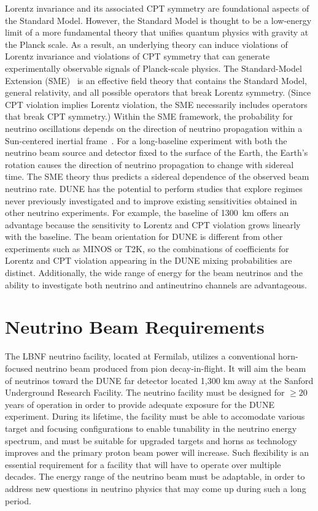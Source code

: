 Lorentz invariance and its associated CPT symmetry
are foundational aspects of the Standard Model. However, the Standard Model is thought to be a low-energy limit of a more fundamental theory that unifies quantum physics with gravity at the Planck
scale. As a result, an underlying theory can induce violations of Lorentz invariance and
violations of CPT symmetry that can generate experimentally observable signals of Planck-scale physics.
The Standard-Model Extension (SME)~\cite{Colladay:1996iz,Colladay:1998fq,Kostelecky:2003fs} is an effective field theory that contains the Standard Model, general relativity, and all possible operators that break Lorentz symmetry. (Since CPT violation implies Lorentz violation, the SME necessarily includes operators that break CPT symmetry.)  Within the SME framework, the probability for neutrino oscillations depends on the direction of neutrino propagation within a Sun-centered inertial frame~\cite{Kostelecky:2003cr,Kostelecky:2011gq}.  For a long-baseline experiment with both the neutrino beam source and detector fixed to the surface of the Earth, the Earth's rotation causes the direction of neutrino propagation to change with sidereal time.  The SME theory thus predicts a sidereal dependence of the observed beam neutrino rate.  DUNE has the potential to perform studies that explore regimes never previously investigated and to improve existing
sensitivities obtained in other neutrino experiments.
For example, the baseline of 1300~km offers an advantage because the sensitivity to 
Lorentz and CPT violation grows linearly with the baseline.   The
beam orientation for DUNE is different from other experiments such as MINOS or T2K, so
the combinations of coefficients for Lorentz and CPT violation appearing in the DUNE mixing probabilities are
distinct. Additionally, the wide range of energy for the beam neutrinos and the ability to investigate both neutrino and antineutrino channels are advantageous.

\section{Neutrino Beam Requirements}
\label{sec:physics-lbnosc-beam-req}
The LBNF neutrino facility, located at Fermilab, utilizes a conventional horn-focused neutrino beam produced from pion decay-in-flight. It will aim the beam of neutrinos toward
the DUNE far detector located 1,300 km away at the Sanford Underground Research Facility. The neutrino facility must be designed for $\ge 20$ years of operation in order to provide adequate exposure for the DUNE experiment. During its lifetime, the facility must be able to accomodate various target and focusing configurations to enable tunability 
in the neutrino energy spectrum, and must be suitable for upgraded targets and horns as technology improves and the primary proton beam power will increase. Such
flexibility is an essential requirement for a facility that will have to operate over multiple decades. The energy range of the neutrino beam must be adaptable, in order to address new questions in neutrino physics that may come up during such a long period.

